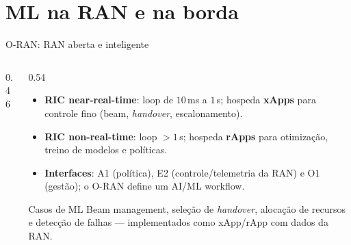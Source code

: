 \documentclass[aspectratio=169,11pt]{beamer}
\begin{document}
\section{ML na RAN e na borda}

\begin{frame}{O-RAN: RAN aberta e inteligente}
  \begin{columns}
    \begin{column}{0.46\textwidth}
      \begin{center}
      \end{center}
    \end{column}
    \begin{column}{0.54\textwidth}
      \begin{itemize}
        \item \textbf{RIC near-real-time}: loop de $10$\,ms a $1$\,s; hospeda \textbf{xApps} para controle fino (beam, \emph{handover}, escalonamento).
        \item \textbf{RIC non-real-time}: loop $>1$\,s; hospeda \textbf{rApps} para otimização, treino de modelos e políticas.
        \item \textbf{Interfaces}: A1 (política), E2 (controle/telemetria da RAN) e O1 (gestão); o O-RAN define um AI/ML workflow.
      \end{itemize}
      \begin{exampleblock}{Casos de ML}
        Beam management, seleção de \emph{handover}, alocação de recursos e detecção de falhas --- implementados como xApp/rApp com dados da RAN.
      \end{exampleblock}
    \end{column}
  \end{columns}
\end{frame}
\end{document}
